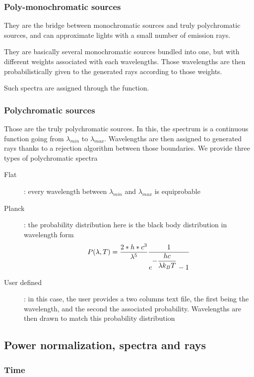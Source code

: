\subsubsection{Poly-monochromatic sources}

They are the bridge between monochromatic sources and truly polychromatic sources, and can approximate lights with a small number of emission rays.

They are basically several monochromatic sources bundled into one, but with different weights associated with each wavelengths. Those wavelengths are then probabilistically given to the generated rays according to those weights.

Such spectra are assigned through the  function.

\subsubsection{Polychromatic sources}

Those are the truly polychromatic sources. In this, the spectrum is a continuous function going from $\lambda_{min}$ to $\lambda_{max}$. Wavelengths are then assigned to generated rays thanks to a rejection algorithm between those boundaries. We provide three types of polychromatic spectra
\begin{description}
	\item[Flat]: every wavelength between $\lambda_{min}$ and $\lambda_{max}$ is equiprobable
	\item[Planck]: the probability distribution here is the black body distribution in wavelength form
	\begin{equation}
		P(\lambda,T)=\frac{2*h*c^3}{\lambda^5}\frac{1}{e^{\displaystyle -\frac{hc}{\lambda k_B T}}-1}
	\end{equation}
	\item[User defined]: in this case, the user provides a two columns text file, the first being the wavelength, and the second the associated probability. Wavelengths are then drawn to match this probability distribution
\end{description}

\subsection{Power normalization, spectra and rays}

\subsubsection{Time}

